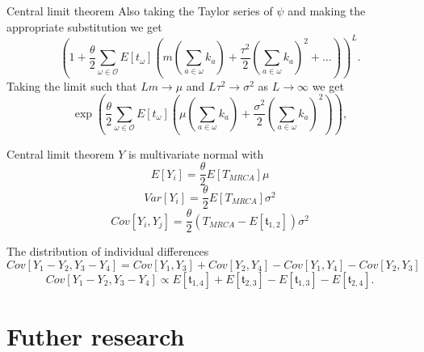 \documentclass{beamer}
\begin{document}
\begin{frame}{Central limit theorem}
  Also taking the Taylor series of $\psi$ and making the appropriate substitution we get
  \begin{equation*}
    \left( 1 + \frac{\theta}{2} \sum_{\omega \in \mathcal{O}} E[t_{\omega}]\left( m \left(
          \sum_{a \in \omega} k_a\right) + \frac{\tau^2}{2}\left( \sum_{a \in \omega}
          k_a\right)^2 + \ldots\right)\right)^L.
  \end{equation*}
  Taking the limit such that $Lm \to \mu$ and $L\tau^2\to \sigma^2$ as $L
  \to \infty$ we get
  \begin{equation*}
    \exp \left( \frac{\theta}{2} \sum_{\omega \in \mathcal{O}}E[t_{\omega}] \left( \mu \left(
          \sum_{a \in \omega} k_a\right) + \frac{\sigma^2}{2}\left( \sum_{a \in \omega}
          k_a\right)^2\right)\right),
  \end{equation*}
\end{frame}

\begin{frame}{Central limit theorem}
  $Y$ is multivariate normal with 
  \begin{equation*}
    E[Y_i] = \frac{\theta}{2} E[T_{MRCA}] \mu
  \end{equation*}
  \begin{equation*}
    Var[Y_i] = \frac{\theta}{2} E[T_{MRCA}] \sigma^2
  \end{equation*}
  \begin{equation*}
    Cov[Y_i, Y_j] = \frac{\theta}{2} (T_{MRCA}-E[\mathfrak{t}_{1,2}] )\sigma^2
  \end{equation*}
\end{frame}

\begin{frame}{The distribution of individual differences}
  \small
  \begin{equation*}
    \label{eq:cov}
    Cov[Y_1-Y_2,Y_3-Y_4]=Cov[Y_1,Y_3]+Cov[Y_2,Y_4]-Cov[Y_1,Y_4]-Cov[Y_2,Y_3]
  \end{equation*}
  \begin{equation*}
    \label{eq:covcoal}
    Cov[Y_1-Y_2,Y_3-Y_4] \propto E[\mathfrak{t}_{1,4}] + E[\mathfrak{t}_{2,3}] - E[\mathfrak{t}_{1,3}] - E[\mathfrak{t}_{2,4}].
  \end{equation*}
\end{frame}

\section{Futher research}
\end{document}
